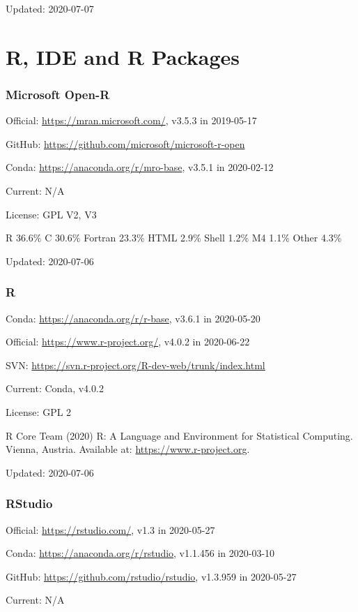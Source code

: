 \documentclass[]{article}
\begin{document}
Updated: 2020-07-07

\part{R, IDE and R Packages}

\section{Microsoft Open-R}

Official: \url{https://mran.microsoft.com/}, v3.5.3 in 2019-05-17

GitHub: \url{https://github.com/microsoft/microsoft-r-open}

Conda: \url{https://anaconda.org/r/mro-base}, v3.5.1 in 2020-02-12

Current: N/A

License: GPL V2, V3

R 36.6\% C 30.6\% Fortran 23.3\% HTML 2.9\% Shell 1.2\% M4 1.1\% Other 4.3\%

Updated: 2020-07-06

\section{R}

Conda: \url{https://anaconda.org/r/r-base}, v3.6.1 in 2020-05-20

Official: \url{https://www.r-project.org/}, v4.0.2 in 2020-06-22

SVN: \url{https://svn.r-project.org/R-dev-web/trunk/index.html}

Current: Conda, v4.0.2

License: GPL 2

R Core Team (2020) R: A Language and Environment for Statistical Computing. Vienna, Austria. Available at: \url{https://www.r-project.org}.

Updated: 2020-07-06

\section{RStudio}

Official: \url{https://rstudio.com/}, v1.3 in 2020-05-27

Conda: \url{https://anaconda.org/r/rstudio}, v1.1.456 in 2020-03-10

GitHub: \url{https://github.com/rstudio/rstudio}, v1.3.959 in 2020-05-27

Current: N/A
\end{document}

